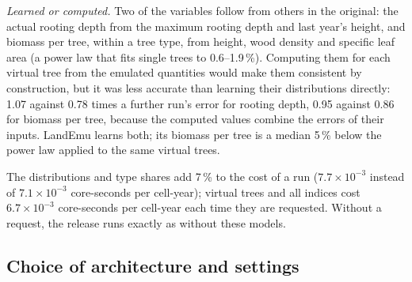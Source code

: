 \documentclass[11pt,a4paper]{article}
\begin{document}
\emph{Learned or computed.} Two of the variables follow from others in the original: the actual rooting depth from the
maximum rooting depth and last year's height, and biomass per tree, within a tree type, from height, wood density and
specific leaf area (a power law that fits single trees to 0.6--1.9\,\%). Computing them for each virtual tree from the
emulated quantities would make them consistent by construction, but it was less accurate than learning their
distributions directly: 1.07 against 0.78 times a further run's error for rooting depth, 0.95 against 0.86 for biomass
per tree, because the computed values combine the errors of their inputs. LandEmu learns both; its biomass per tree is
a median 5\,\% below the power law applied to the same virtual trees.

The distributions and type shares add 7\,\% to the cost of a run ($7.7\times10^{-3}$ instead of $7.1\times10^{-3}$
core-seconds per cell-year); virtual trees and all indices cost $6.7\times10^{-3}$ core-seconds per cell-year each time
they are requested. Without a request, the release runs exactly as without these models.

\subsection{Choice of architecture and settings}\label{sec:choices}
\end{document}
